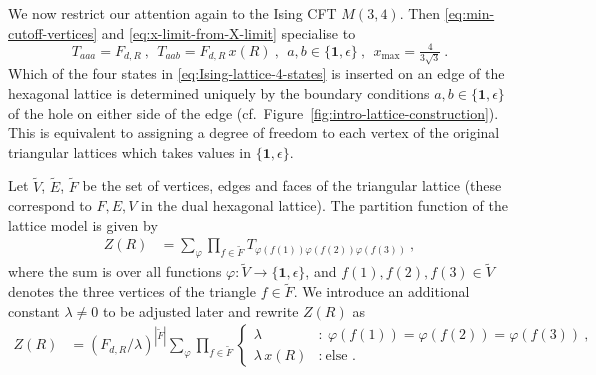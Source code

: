 \documentclass[11pt,a4paper]{article}
\numberwithin{equation}{section}
\newcommand{\one}{\mathbf{1}} %
\begin{document}
We now restrict our attention again to the Ising CFT $M(3,4)$. Then \eqref{eq:min-cutoff-vertices} and \eqref{eq:x-limit-from-X-limit} specialise to
\begin{equation}
    T_{aaa} = F_{d,R}
    ~,~~
    T_{aab} = 
    F_{d,R} \, x(R)
    ~,~~
    a,b \in \{\one,\epsilon\}
    ~,~~
    x_\text{max} = \tfrac{4}{3\sqrt{3}} \ .
\end{equation}
Which of the four states in \eqref{eq:Ising-lattice-4-states} is inserted on an edge of the hexagonal lattice is determined uniquely by the boundary conditions $a,b \in \{\one,\epsilon\}$ of the hole on either side of the edge (cf.\ Figure~\ref{fig:intro-lattice-construction}). This is equivalent to assigning a degree of freedom to each vertex of the original triangular lattices which takes values in $\{\one,\epsilon\}$. 

Let $\tilde V$, $\tilde E$, $\tilde F$ be the set of vertices, edges and faces of the triangular lattice  (these correspond to $F,E,V$ in the dual hexagonal lattice). The partition function of the lattice model is given by 
\begin{align}
    Z(R) 
    &= 
    \sum_\varphi \prod_{f \in \tilde F} T_{\varphi(f(1))\varphi(f(2))\varphi(f(3))} \ ,
\end{align}
where the sum is over all functions $\varphi : \tilde V \to \{\one,\epsilon\}$, and $f(1),f(2),f(3) \in \tilde V$ denotes the three vertices of the triangle $f \in \tilde F$. We introduce an additional constant $\lambda \neq 0$ to be adjusted later and rewrite $Z(R)$ as
\begin{align}\label{eq:ZR-Ising-example}
    Z(R) 
    &=
    (F_{d,R} / \lambda)^{|\tilde F|}
    \sum_\varphi \prod_{f \in \tilde F}
    \begin{cases}
        \lambda &:~ \varphi(f(1))=\varphi(f(2))=\varphi(f(3)) \ ,
        \\
        \lambda \, x(R) &:~ \text{else .}
    \end{cases}
\end{align}
\end{document}
